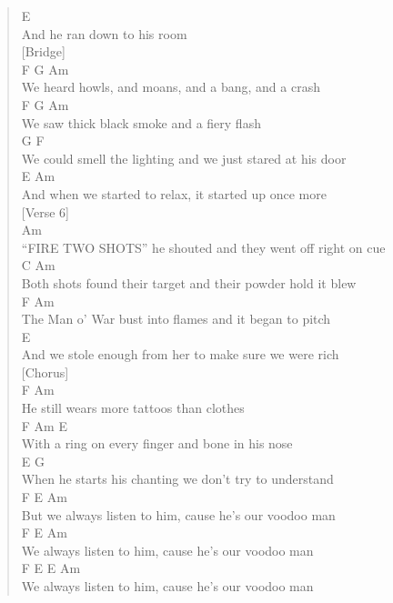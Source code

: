 \documentclass[11pt]{article}
\begin{document}
\begin{verse}
E\\
And he ran down to his room\\
\vspace*{1em}
[Bridge]\\
F                   G            Am\\
We heard howls, and moans, and a bang, and a crash\\
F                  G     Am\\
We saw thick black smoke and a fiery flash\\
G                                       F\\
We could smell the lighting and we just stared at his door\\
\hspace*{4em}E                                           Am\\
And when we started to relax, it started up once more\\
\vspace*{1em}
[Verse 6]\\
Am\\
``FIRE TWO SHOTS'' he shouted and they went off right on cue\\
C                                       Am\\
Both shots found their target and their powder hold it blew\\
\hspace*{4em}F                               Am\\
The Man o' War bust into flames and it began to pitch\\
E\\
And we stole enough from her to make sure we were rich\\
\vspace*{1em}
[Chorus]\\
F                                Am\\
He still wears more tattoos than clothes\\
\hspace*{7em}F                        Am           E\\
With a ring on every finger and bone in his nose\\
E                                    G\\
When he starts his chanting we don't try to understand\\
\hspace*{7em}F             E             Am\\
But we always listen to him, cause he's our voodoo man\\
\hspace*{3em}F             E             Am\\
We always listen to him, cause he's our voodoo man\\
\hspace*{3em}F             E             E               Am\\
We always listen to him, cause he's our voodoo man\\
\end{verse}
\clearpage
\end{document}
